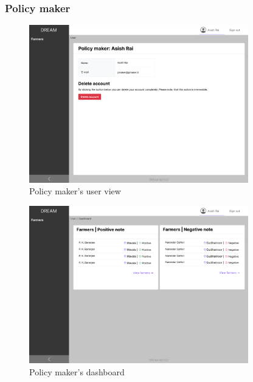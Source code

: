 \subsubsection{Policy maker}

\begin{figure}[H]
\centering
\includegraphics[width=0.85\textwidth]{mockups/Policy maker_User.png}
\caption{Policy maker's user view}
\end{figure}

\begin{figure}[H]
\centering
\includegraphics[width=0.85\textwidth]{mockups/Policy maker_Dashboard.png}
\caption{Policy maker's dashboard}
\end{figure}

